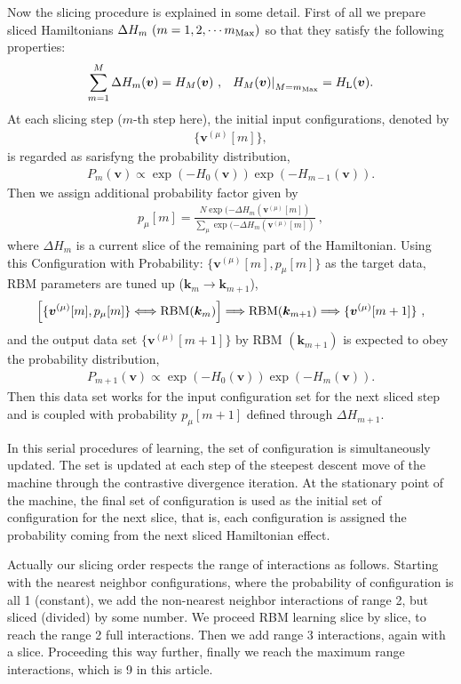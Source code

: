 \documentclass[a4paper,preprint,superscriptaddress,preprintnumbers,nofootinbib]{revtex4}
\newcommand{\Be}{\begin{eqnarray}}
\newcommand{\Ee}{\end{eqnarray}}
\begin{document}
Now the slicing procedure is explained in some detail.
First of all we prepare sliced Hamiltonians $\Delta H_m \ (m=1,2,\cdots m_{\rm Max})$
so that they satisfy the following properties:
\Be
\sum_{m=1}^{M} \Delta H_m (\bm{v}) = H_M(\bm{v})\ ,\ \ 
\left. H_M(\bm{v}) \right|_{M=m_{\rm Max}}=H_{\rm L} (\bm{v}).
\Ee
At each slicing step ($m$-th step here), the initial input configurations, denoted by
\Be
\{\bm{v}^{(\mu)}[m]\},
\Ee
is regarded as sarisfyng the probability distribution,
\Be
P_m(\bm{v}) \propto \exp(-H_0(\bm{v})) \exp(-H_{m-1}(\bm{v})).
\Ee
Then we assign additional probability factor given by
\Be
p_\mu[m]=
\frac{N\exp (-\Delta H_m(\bm{v}^{(\mu)}[m])}
{\displaystyle\sum_\mu\exp (-\Delta H_m(\bm{v}^{(\mu)}[m])}\ ,
\Ee
where $\Delta H_m$ is a current slice of the remaining part of the Hamiltonian. 
Using this
Configuration with Probability: $\{\bm{v}^{(\mu)}[m], p_\mu[m]\}$ as the target
data, RBM parameters are tuned up ($\bm{k}_m \rightarrow \bm{k}_{m+1}$),
\Be
\left[\{\bm{v}^{(\mu)}[m], p_\mu[m]\} \Longleftrightarrow {\rm RBM}(\bm{k}_m)
\right]
\Longrightarrow{\rm RBM}(\bm{k}_{m+1})\Longrightarrow
\{\bm{v}^{(\mu)}[m+1]\}\ ,
\Ee
and the output data set $\{\bm{v}^{(\mu)}[m+1]\}$ 
by RBM $(\bm{k}_{m+1})$ is expected to obey the probability distribution,
\Be
P_{m+1}(\bm{v}) \propto \exp(-H_0(\bm{v})) \exp(-H_{m}(\bm{v})).
\Ee
Then this data set works for the
input configuration set for the next sliced step and is coupled with 
probability $p_\mu[m+1]$ defined through $\Delta H_{m+1}$.

In this serial procedures of learning, the set of configuration is
simultaneously updated. The set is updated at each step of the
steepest descent move of the machine through the contrastive
divergence iteration. At the stationary point of the machine, the
final set of configuration is used as the initial set of configuration
for the next slice, that is, each configuration is assigned the 
probability coming from the next sliced Hamiltonian effect.

Actually our slicing order respects the range of interactions
as follows.
Starting with the nearest neighbor configurations, where the probability
of configuration is all 1 (constant), we add the non-nearest neighbor
interactions of range 2, but sliced (divided) by some number. We proceed RBM
learning slice by slice, to reach the range 2 full interactions.
Then we add range 3 interactions, again with a slice. Proceeding
this way further, finally we reach the maximum range interactions,
which is 9 in this article.
\end{document}

